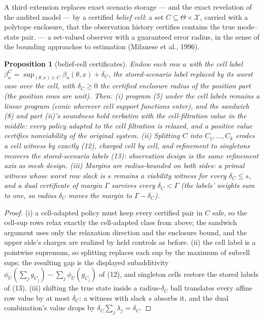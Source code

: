\documentclass[10pt,twocolumn]{article}
\theoremstyle{plain}
\newtheorem{proposition}[theorem]{Proposition}
\theoremstyle{definition}
\theoremstyle{remark}
\begin{document}
A third extension replaces exact scenario storage --- and the exact
revelation of the audited model --- by a certified \emph{belief cell}: a
set \(C \subseteq \Theta \times \mathcal{X}\), carried with a polytope
enclosure, that the observation history certifies contains the true
mode--state pair. --- a set-valued observer with a guaranteed error radius, in the sense
of the bounding approaches to estimation (Milanese et al., 1996).

\begin{proposition}[belief-cell certificates]\label{prop:beliefcells}
Endow each row \(a\) with the cell label
\(\beta_a^{C} = \sup_{(\theta,x) \in C} \beta_a(\theta,x) +
\delta_C\), the stored-scenario label replaced by its worst case over the
cell, with \(\delta_C \ge 0\) the certified enclosure radius of the
position part (the position rows are unit). Then:
\emph{(i)} program (5) under the cell labels remains a linear program
(conic wherever cell support functions enter), and the sandwich (8) and
part (ii)'s soundness hold verbatim with the cell-filtration value in the
middle: every policy adapted to the cell filtration is relaxed, and a
positive value certifies nonviability of the original system.
\emph{(ii)} Splitting \(C\) into \(C_1, \dots, C_k\) erodes a cell
witness by exactly (12), charged cell by cell, and refinement to singletons
recovers the stored-scenario labels (13): observation design is the same
refinement axis as mesh design. \emph{(iii)} Margins are radius-bounded on
both sides: a primal witness whose worst row slack is \(s\) remains a
viability witness for every \(\delta_C \le s\), and a dual certificate
of margin \(\Gamma\) survives every \(\delta_C < \Gamma\) (the
labels' weights sum to one, so radius \(\delta_C\) moves the margin to
\(\Gamma - \delta_C\)).
\end{proposition}

\begin{proof}
(i) a cell-adapted policy must keep every certified pair in \(C\) safe, so
the cell-sup rows relax exactly the cell-adapted class from above; the
sandwich argument uses only the relaxation direction and the enclosure
bound, and the upper side's charges are realized by held controls as before.
(ii) the cell label is a pointwise supremum, so splitting replaces each sup
by the maximum of subcell sups; the resulting gap is the displayed
subadditivity \(\phi_U(\sum_j g_{C_j}) - \sum_j \phi_U(g_{C_j})\) of
(12), and singleton cells restore the stored labels of (13). (iii) shifting
the true state inside a radius-\(\delta_C\) ball translates every affine
row value by at most \(\delta_C\): a witness with slack \(s\) absorbs
it, and the dual combination's value drops by \(\delta_C \sum_j
\lambda_j = \delta_C\).
\end{proof}
\end{document}
